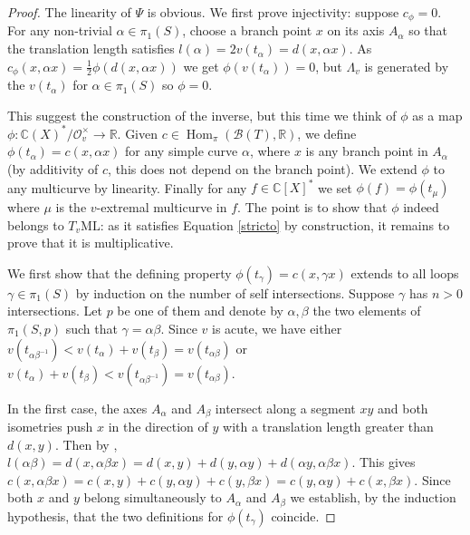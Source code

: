 \documentclass{amsart}
\newcommand{\C}{\mathbb{C}}
\newcommand{\R}{\mathbb{R}}
\newcommand{\ML}{\mathrm{ML}}
\newcommand{\Oo}{\mathcal{O}}
\newcommand{\Bb}{\mathcal{B}}
\DeclareMathOperator{\Hom}{Hom}
\begin{document}
\begin{proof}
The linearity of $\Psi$ is obvious.
We first prove injectivity: suppose $c_\phi=0$. For any non-trivial $\alpha\in \pi_1(S)$, choose a branch point $x$ on its axis $A_\alpha$ so that the translation length satisfies  $l(\alpha)=2v(t_\alpha)=d(x,\alpha x)$. As $c_\phi(x,\alpha x)=\frac{1}{2}\phi(d(x,\alpha x))$ we get $\phi(v(t_\alpha))=0$, but $\Lambda_v$ is generated by the $v(t_\alpha)$ for $\alpha\in \pi_1(S)$ so $\phi=0$. 

This suggest the construction of the inverse, but this time we think of $\phi$ as a map $\phi:\C(X)^*/\Oo_v^\times\to \R$. Given $c\in \Hom_\pi(\Bb(T),\R)$, we define $\phi(t_\alpha)= c(x,\alpha x)$ for any simple curve $\alpha$, where $x$ is any branch point in $A_\alpha$ (by additivity of $c$, this does not depend on the branch point). We extend $\phi$ to any multicurve by linearity. Finally for any $f\in \C[X]^*$ we set $\phi(f)=\phi(t_\mu)$ where $\mu$ is the $v$-extremal multicurve in $f$. The point is to show that $\phi$ indeed belongs to $T_v\ML$: as it satisfies Equation \eqref{stricto} by construction, it remains to prove that it is multiplicative.

We first show that the defining property $\phi(t_\gamma)=c(x,\gamma x)$ extends to all loops $\gamma \in \pi_1(S)$ by induction on the number of self intersections.
%
%
%
Suppose $\gamma$ has $n>0$ intersections. Let $p$ be one of them and denote by $\alpha,\beta$ the two elements of $\pi_1(S,p)$ such that $\gamma=\alpha\beta$. Since $v$ is acute, we have either $v(t_{\alpha\beta^{-1}})<v(t_\alpha)+v(t_\beta)=v(t_{\alpha\beta})$ or $v(t_\alpha)+v(t_\beta)<v(t_{\alpha\beta^{-1}})=v(t_{\alpha\beta})$. 

In the first case, the axes $A_\alpha$ and $A_\beta$ intersect along a segment $xy$ and both isometries push $x$ in the direction of $y$ with a translation length greater than $d(x,y)$. 
Then by \cite[Proposition 1.6]{Paulin_Gromov-R-trees_1989}, $l(\alpha\beta)=d(x,\alpha\beta x)=d(x,y)+d(y,\alpha y)+d(\alpha y,\alpha\beta x)$. This gives $c(x,\alpha\beta x)=c(x,y)+c(y,\alpha y)+c(y,\beta x)=c(y,\alpha y)+c(x,\beta x)$. 
Since both $x$ and $y$ belong simultaneously to $A_\alpha$ and $A_\beta$ we establish, by the induction hypothesis, that the two definitions for $\phi(t_\gamma)$ coincide. 


\end{proof}
\end{document}
